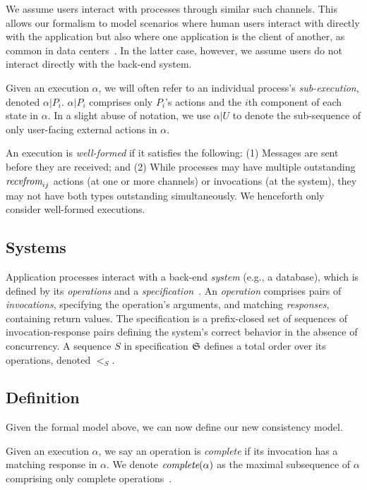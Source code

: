 We assume users interact with processes through similar such channels. This
allows our formalism to model scenarios where human users interact with
directly with the application but also where one application is the client
of another, as common in data centers~\cite{kraken2016veeraraghavan,malteThesis}.
In the latter case, however, we assume users do not interact directly with the
back-end system.

Given an execution $\alpha$, we will often refer to an individual process's
\textit{sub-execution}, denoted $\alpha|P_i$. $\alpha|P_i$ comprises
only $P_i$'s actions and the $i$th component of each state in $\alpha$.
In a slight abuse of notation, we use $\alpha|U$ to denote the sub-sequence
of only user-facing external actions in $\alpha$. 

 An execution is \textit{well-formed} if it
satisfies the following: (1) Messages are sent before they are received; and
(2) While processes may have multiple outstanding $\operatorname*{\textit{recvfrom}}_{ij}$ actions
(at one or more channels) or invocations (at the system), they may not have
both types outstanding simultaneously. We henceforth only consider well-formed
executions.

\subsection{Systems}
\label{sec:mdl:systems}

Application processes interact with a back-end \textit{system} (e.g., a database),
which is defined by its \textit{operations} and a
\textit{specification}~\cite{herlihy1990linearizability,lynch1996da}. An
\textit{operation} comprises pairs of \textit{invocations}, specifying the
operation's arguments, and matching \textit{responses}, containing
return values. The specification is a prefix-closed set of sequences of
invocation-response pairs defining the system's correct behavior in the absence
of concurrency. A sequence $S$ in specification $\mathfrak{S}$ defines a total order
over its operations, denoted $<_S$.

\subsection{Definition}
\label{sec:mdl:def}

Given the formal model above, we can now define our new consistency model.

Given an execution $\alpha$, we say an
operation is \textit{complete} if its invocation has a matching response in
$\alpha$. We denote $\operatorname*{\textit{complete}}(\alpha)$ as the maximal subsequence of $\alpha$
comprising only complete operations~\cite{herlihy1990linearizability}.

